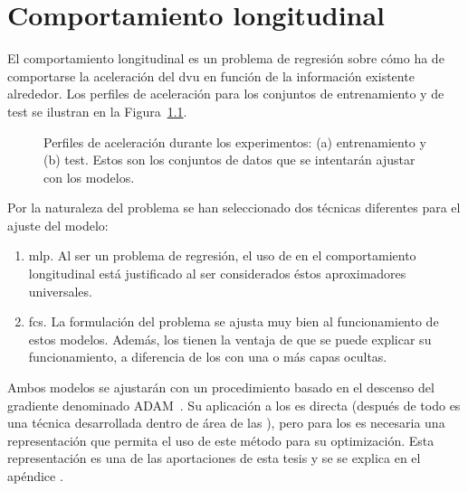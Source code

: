 \chapter{Comportamiento longitudinal}
\label{ch:longitudinal-model}

El comportamiento longitudinal es un problema de regresión sobre cómo ha de comportarse la aceleración del \gls{dvu} en función de la información existente alrededor. Los perfiles de aceleración para los conjuntos de entrenamiento y de test se ilustran en la Figura~\ref{fig:acceleration-profiles}.

\begin{figure}
	\centering
	\qquad
	\caption[Perfiles de aceleración a ajustar por los modelos. Conjuntos de entrenamiento y de test]{Perfiles de aceleración durante los experimentos: (a) entrenamiento y (b) test. Estos son los conjuntos de datos que se intentarán ajustar con los modelos.}
	\label{fig:acceleration-profiles}
\end{figure}

Por la naturaleza del problema se han seleccionado dos técnicas diferentes para el ajuste del modelo:

\begin{enumerate}
	\item \Acrshort{mlp}. Al ser un problema de regresión, el uso de  en el comportamiento longitudinal está justificado al ser considerados éstos aproximadores universales.
	\item \Acrshort{fcs}. La formulación del problema se ajusta muy bien al funcionamiento de estos modelos. Además, los  tienen la ventaja de que se puede explicar su funcionamiento, a diferencia de los  con una o más capas ocultas.
\end{enumerate}

Ambos modelos se ajustarán con un procedimiento basado en el descenso del gradiente denominado ADAM~\cite{kingma2014adam}. Su aplicación a los  es directa (después de todo es una técnica desarrollada dentro de área de las ), pero para los  es necesaria una representación que permita el uso de este método para su optimización. Esta representación es una de las aportaciones de esta tesis y se se explica en el apéndice .

